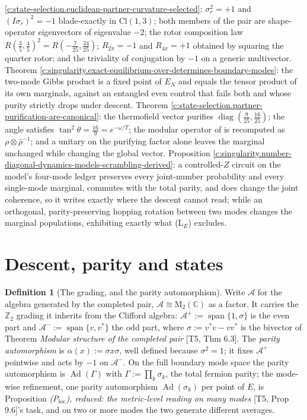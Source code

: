 \documentclass[11pt]{article}
\theoremstyle{definition}
\newtheorem{definition}[theorem]{Definition}
\theoremstyle{plain}
\providecommand{\Aa}{}\renewcommand{\Aa}{\mathcal{A}}
\providecommand{\Aev}{}\renewcommand{\Aev}{\mathcal{A}^{+}}
\providecommand{\Aod}{}\renewcommand{\Aod}{\mathcal{A}^{-}}
\providecommand{\C}{}\renewcommand{\C}{\mathbb{C}}
\providecommand{\Cl}{}\renewcommand{\Cl}{\mathrm{Cl}}
\providecommand{\EN}{}\renewcommand{\EN}{E_{N}}
\providecommand{\Mat}{}\renewcommand{\Mat}{\mathrm{M}}
\begin{document}
\ref{c:state-selection.euclidean-partner-curvature-selected}: $\sigma_r^{2} = +1$ and $(I\sigma_r)^{2} = -1$ blade-exactly in $\Cl(1,3)$; both members of the pair are shape-operator eigenvectors of eigenvalue $-2$; the rotor composition law $R(\tfrac35,\tfrac45)^{2} = R(-\tfrac{7}{25},\tfrac{24}{25})$; $R_{2\pi} = -1$ and $R_{4\pi} = +1$ obtained by squaring the quarter rotor; and the triviality of conjugation by $-1$ on a generic multivector. Theorem \ref{c:singularity.exact-equilibrium-over-determines-boundary-modes}: the two-mode Gibbs product is a fixed point of $\EN$ and equals the tensor product of its own marginals, against an entangled even control that fails both and whose purity strictly drops under descent. Theorem \ref{c:state-selection.partner-purification-are-canonical}: the thermofield vector purifies $\operatorname{diag}(\tfrac{9}{25}, \tfrac{16}{25})$; the angle satisfies $\tan^{2}\theta = \tfrac{16}{9} = e^{-\omega/T}$; the modular operator of \cite[Lem.~7.1]{ButlerT5} is recomputed as $\rho \otimes \bar\rho^{-1}$; and a unitary on the purifying factor alone leaves the marginal unchanged while changing the global vector. Proposition \ref{c:singularity.number-diagonal-dynamics-models-scrambling-derived}: a controlled-$Z$ circuit on the model's four-mode ledger preserves every joint-number probability and every single-mode marginal, commutes with the total parity, and does change the joint coherence, so it writes exactly where the descent cannot read; while an orthogonal, parity-preserving hopping rotation between two modes changes the marginal populations, exhibiting exactly what (L$_E$) excludes.

\section{Descent, parity and states}

\begin{definition}[The grading, and the parity automorphism]\label{c:obj.singularity.grading-parity-automorphism}
Write $\Aa$ for the algebra generated by the completed pair, $\Aa \cong \Mat_2(\C)$ as a factor. It carries the $\mathbb{Z}_2$ grading it inherits from the Clifford algebra: $\Aev := \operatorname{span}\{1, \sigma\}$ is the even part and $\Aod := \operatorname{span}\{v, v^{*}\}$ the odd part, where $\sigma := v^{*}v - vv^{*}$ is the bivector of Theorem \emph{Modular structure of the completed pair} [T5, Thm 6.3]. The \emph{parity automorphism} is $\alpha(x) := \sigma x \sigma$, well defined because $\sigma^{2} = 1$; it fixes $\Aev$ pointwise and acts by $-1$ on $\Aod$. On the full boundary mode space the parity automorphism is $\operatorname{Ad}(\Gamma)$ with $\Gamma := \prod_k \sigma_k$, the total fermion parity; the mode-wise refinement, one parity automorphism $\operatorname{Ad}(\sigma_k)$ per point of $E$, is Proposition \emph{(P$_{\mathrm{loc}}$), reduced: the metric-level reading on many modes} [T5, Prop 9.6]'s task, and on two or more modes the two generate different averages.
\end{definition}
\end{document}

